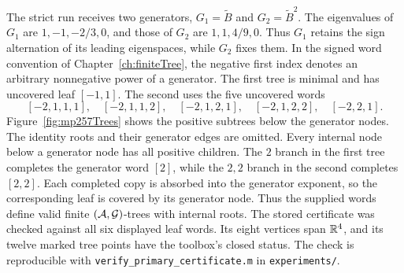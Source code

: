 The strict run receives two generators, $G_1=\widetilde{B}$ and $G_2=\widetilde{B}^2$.
The eigenvalues of $G_1$ are $1,-1,-2/3,0$, and those of $G_2$ are $1,1,4/9,0$.
Thus $G_1$ retains the sign alternation of its leading eigenspaces, while $G_2$ fixes them.
In the signed word convention of Chapter~\ref{ch:finiteTree}, the negative first index denotes an arbitrary nonnegative power of a generator.
The first tree is minimal and has uncovered leaf $[-1,1]$.
The second uses the five uncovered words
\[
    [-2,1,1,1],\quad[-2,1,1,2],\quad[-2,1,2,1],\quad[-2,1,2,2],\quad[-2,2,1].
\]
Figure~\ref{fig:mp257Trees} shows the positive subtrees below the generator nodes.
The identity roots and their generator edges are omitted.
Every internal node below a generator node has all positive children.
The $2$ branch in the first tree completes the generator word $[2]$, while the $2,2$ branch in the second completes $[2,2]$.
Each completed copy is absorbed into the generator exponent, so the corresponding leaf is covered by its generator node.
Thus the supplied words define valid finite $(\mathcal{A},\mathcal{G})$-trees with internal roots.
The stored certificate was checked against all six displayed leaf words.
Its eight vertices span $\mathbb{R}^4$, and its twelve marked tree points have the toolbox's closed status.
The check is reproducible with \texttt{verify\_primary\_certificate.m} in \texttt{experiments/}.

